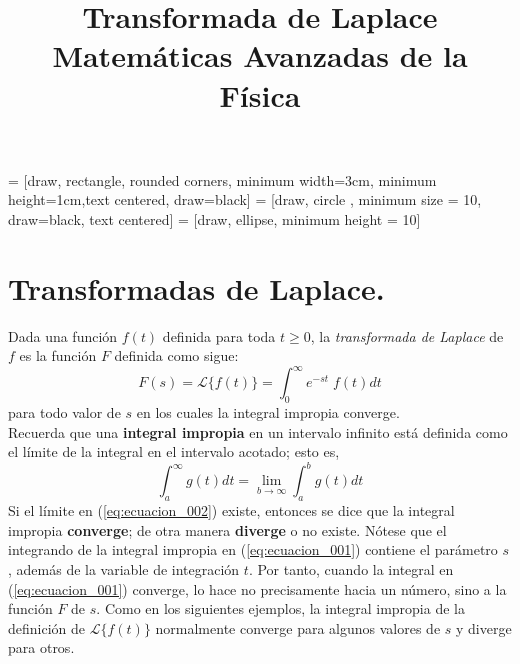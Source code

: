 
\usepackage{standalone}
\usepackage{mathrsfs}
\usepackage{bigints}
\usepackage{tikz}
\usetikzlibrary{decorations.pathmorphing,patterns}
\usetikzlibrary{shapes.geometric, arrows}
 = [draw, rectangle, rounded corners, minimum width=3cm, minimum height=1cm,text centered, draw=black]
 = [draw, circle , minimum size = 10, draw=black, text centered]
 = [draw, ellipse, minimum height = 10]
\usepackage{pgfplots}
\usepackage{float}
\newtheorem{teo}{Teorema}
\newtheorem{cor}{Corolario}
\title{Transformada de Laplace \\ {\large Matemáticas Avanzadas de la Física}}
\date{ }

\renewcommand\labelenumii{\theenumi.{\arabic{enumii}}}
\maketitle
\fontsize{14}{14}\selectfont
\section{Transformadas de Laplace.}
Dada una función $f(t)$ definida para toda $t \geq 0$, la \emph{transformada de Laplace} de $f$ es la función $F$ definida como sigue:
\begin{equation}
F(s) = \mathscr{L} \{ f(t) \} = \int_{0}^{\infty} e^{-st} \; f(t) dt
\label{eq:ecuacion_001}
\end{equation}
para todo valor de $s$ en los cuales la integral impropia converge.
\\
Recuerda que una \textbf{integral impropia} en un intervalo infinito está definida como el límite de la integral en el intervalo acotado; esto es,
\begin{equation}
\int_{a}^{\infty} g(t) dt = \lim_{b \to \infty} \int_{a}^{b} g(t) dt
\label{eq:ecuacion_002}
\end{equation}
Si el límite en (\ref{eq:ecuacion_002}) existe, entonces se dice que la integral impropia  \textbf{converge}; de otra manera \textbf{diverge} o no existe. Nótese que el integrando de la integral impropia en (\ref{eq:ecuacion_001}) contiene el parámetro $s$, además de la variable de integración $t$. Por tanto, cuando la integral en (\ref{eq:ecuacion_001}) converge, lo hace no precisamente hacia un número, sino a la función $F$ de $s$. Como en los siguientes ejemplos, la integral impropia de la definición de $\mathscr{L} \{ f(t) \} $ normalmente converge para algunos valores de $s$ y diverge para otros.
